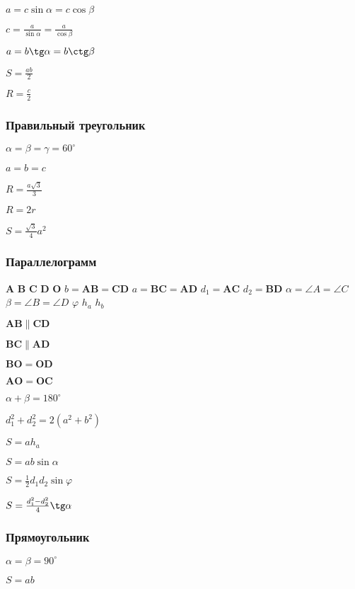 $ a = c \sin \alpha = c \cos \beta $

$ c = \frac{a}{\sin \alpha} = \frac{a}{\cos \beta} $

$ a = b\tg \alpha = b \ctg \beta $

$ S = \frac{a b}{2} $

$ R = \frac{c}{2} $

\subsubsection{Правильный треугольник}

$ \alpha = \beta = \gamma = 60^{\circ} $

$ a = b = c $

$ R = \frac{a\sqrt{3}}{3} $

$ R = 2r $

$ S = \frac{\sqrt{3}}{4} a^2 $

\subsubsection{Параллелограмм}

$\boldsymbol{A}$
$\boldsymbol{B}$
$\boldsymbol{C}$
$\boldsymbol{D}$
$\boldsymbol{O}$
$b = \boldsymbol{AB} = \boldsymbol{CD}$
$a = \boldsymbol{BC} = \boldsymbol{AD}$
$d_1 = \boldsymbol{AC}$
$d_2 = \boldsymbol{BD}$
$\alpha = \angle A = \angle C$
$\beta = \angle B = \angle D$
$\varphi$
$h_a$
$h_b$

$ \boldsymbol{AB} \parallel \boldsymbol{CD} $

$ \boldsymbol{BC} \parallel \boldsymbol{AD} $

$ \boldsymbol{BO} = \boldsymbol{OD} $

$ \boldsymbol{AO} = \boldsymbol{OC} $

$ \alpha + \beta = 180^{\circ} $

$ d_1^2 + d_2^2 = 2(a^2 + b^2) $

$ S = a h_a $

$ S = a b \sin \alpha $

$ S = \frac{1}{2} d_1 d_2 \sin \varphi $

$ S = \frac{d_1^2 - d_2^2}{4} \tg \alpha $

\subsubsection{Прямоугольник}

$ \alpha = \beta = 90^{\circ} $

$ S = a b $

